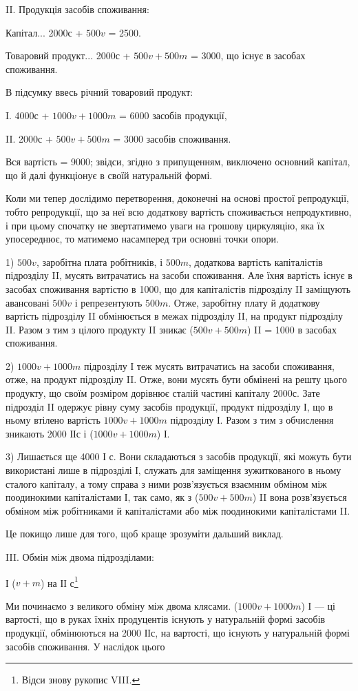 \parcont{}  %
II. Продукція засобів споживання:

Капітал... 2000с + $500v$ = 2500.

Товаровий продукт... 2000с + $500v + 500m$ = 3000, що існує в
засобах споживання.

В підсумку ввесь річний товаровий продукт:

I.    4000с + $1000v + 1000m$ = 6000 засобів продукції,

II.    2000с + $500v + 500m$ = 3000 засобів споживання.

Вся вартість = 9000; звідси, згідно з припущенням, виключено основний
капітал, що й далі функціонує в своїй натуральній формі.

Коли ми тепер дослідимо перетворення, доконечні на основі простої
репродукції, тобто репродукції, що за неї всю додаткову вартість
споживається непродуктивно, і при цьому спочатку не звертатимемо уваги
на грошову циркуляцію, яка їх упосереднює, то матимемо насамперед
три основні точки опори.

1) $500v$, заробітна плата робітників, і $500m$, додаткова вартість капіталістів
підрозділу II, мусять витрачатись на засоби споживання. Але
їхня вартість існує в засобах споживання вартістю в 1000, що для капіталістів
підрозділу II заміщують авансовані $500v$ і репрезентують $500m$.
Отже, заробітну плату й додаткову вартість підрозділу II обмінюється
в межах підрозділу II, на продукт підрозділу II. Разом з тим з цілого
продукту II зникає ($500v + 500m$) II = 1000 в засобах споживання.

2) $1000v + 1000m$ підрозділу І теж мусять витрачатись на засоби
споживання, отже, на продукт підрозділу II. Отже, вони мусять бути обмінені
на решту цього продукту, що своїм розміром дорівнює сталій
частині капіталу 2000с. Зате підрозділ II одержує рівну суму засобів
продукції, продукт підрозділу І, що в ньому втілено вартість $1000v +
1000m$ підрозділу І. Разом з тим з обчислення зникають 2000 ІІс і
($1000v + 1000m$) І.

3) Лишається ще 4000 І с. Вони складаються з засобів продукції, які
можуть бути використані лише в підрозділі І, служать для заміщення
зужиткованого в ньому сталого капіталу, а тому справа з ними розв’язується
взаємним обміном між поодинокими капіталістами І, так само, як
з ($500v + 500m$) II вона розв’язується обміном між робітниками й капіталістами
або між поодинокими капіталістами II.

Це покищо лише для того, щоб краще зрозуміти дальший виклад.

III. Обмін між двома підрозділами:

І ($v + m$) на ІІ с\footnote{
Відси знову рукопис VIII.
}

Ми починаємо з великого обміну між двома клясами. ($1000v +
1000m$) І — ці вартості, що в руках їхніх продуцентів існують у натуральній
формі засобів продукції, обмінюються на 2000 ІІс, на вартості,
що існують у натуральній формі засобів споживання. У наслідок цього
\parbreak{}  %
